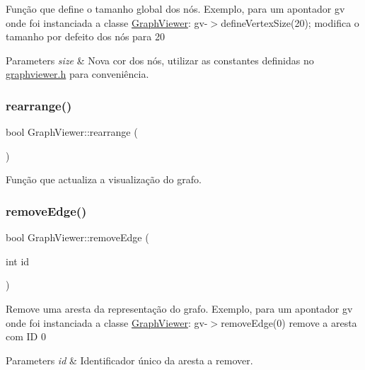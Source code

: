 Função que define o tamanho global dos nós. Exemplo, para um apontador gv onde foi instanciada a classe \hyperlink{class_graph_viewer}{Graph\+Viewer}\+: gv-\/$>$define\+Vertex\+Size(20); modifica o tamanho por defeito dos nós para 20


\begin{DoxyParams}{Parameters}
{\em size} & Nova cor dos nós, utilizar as constantes definidas no \hyperlink{graphviewer_8h}{graphviewer.\+h} para conveniência. \\
\hline
\end{DoxyParams}
\hypertarget{class_graph_viewer_a3009a66958686ccb7e78b68e37c3c423}{}\label{class_graph_viewer_a3009a66958686ccb7e78b68e37c3c423} 
\subsubsection{\texorpdfstring{rearrange()}{rearrange()}}
{\footnotesize\ttfamily bool Graph\+Viewer\+::rearrange (\begin{DoxyParamCaption}{ }\end{DoxyParamCaption})}

Função que actualiza a visualização do grafo. \hypertarget{class_graph_viewer_a9a8ee68c7c12b373affbe4069dd95d72}{}\label{class_graph_viewer_a9a8ee68c7c12b373affbe4069dd95d72} 
\subsubsection{\texorpdfstring{remove\+Edge()}{removeEdge()}}
{\footnotesize\ttfamily bool Graph\+Viewer\+::remove\+Edge (\begin{DoxyParamCaption}\item[{int}]{id }\end{DoxyParamCaption})}

Remove uma aresta da representação do grafo. Exemplo, para um apontador gv onde foi instanciada a classe \hyperlink{class_graph_viewer}{Graph\+Viewer}\+: gv-\/$>$remove\+Edge(0) remove a aresta com ID 0


\begin{DoxyParams}{Parameters}
{\em id} & Identificador único da aresta a remover. \\
\hline
\end{DoxyParams}
\hypertarget{class_graph_viewer_a0c418639bb911eb827cabf895915f775}{}\label{class_graph_viewer_a0c418639bb911eb827cabf895915f775} 
